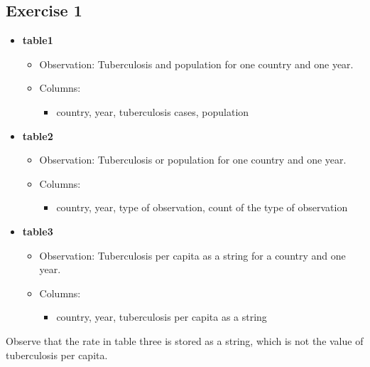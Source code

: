 \documentclass[
  letterpaper,
  DIV=11,
  numbers=noendperiod]{scrreprt}
\providecommand{\tightlist}{%
  \setlength{\itemsep}{0pt}\setlength{\parskip}{0pt}}\usepackage{longtable,booktabs,array}
\begin{document}
\subsection{Exercise 1}\label{exercise-1-13}

\begin{itemize}
\tightlist
\item
  \textbf{table1}

  \begin{itemize}
  \tightlist
  \item
    Observation: Tuberculosis and population for one country and one
    year.
  \item
    Columns:

    \begin{itemize}
    \tightlist
    \item
      country, year, tuberculosis cases, population
    \end{itemize}
  \end{itemize}
\item
  \textbf{table2}

  \begin{itemize}
  \tightlist
  \item
    Observation: Tuberculosis or population for one country and one
    year.
  \item
    Columns:

    \begin{itemize}
    \tightlist
    \item
      country, year, type of observation, count of the type of
      observation
    \end{itemize}
  \end{itemize}
\item
  \textbf{table3}

  \begin{itemize}
  \tightlist
  \item
    Observation: Tuberculosis per capita as a string for a country and
    one year.
  \item
    Columns:

    \begin{itemize}
    \tightlist
    \item
      country, year, tuberculosis per capita as a string
    \end{itemize}
  \end{itemize}
\end{itemize}

Observe that the rate in table three is stored as a string, which is not
the value of tuberculosis per capita.
\end{document}
